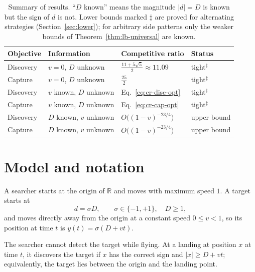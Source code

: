 \documentclass[runningheads,envcountsame,envcountsect]{llncs}
\begin{document}
\begin{table}[t]
\centering
\caption{Summary of results. ``$D$ known'' means the magnitude $|d| = D$ is known but the sign of $d$ is not. Lower bounds marked $\ddagger$ are proved for alternating strategies (Section~\ref{sec:lower}); for arbitrary side patterns only the weaker bounds of Theorem~\ref{thm:lb-universal} are known.}
\label{tab:summary}
\begin{tabular}{llll}
\toprule
Objective & Information & Competitive ratio & Status \\
\midrule
Discovery & $v = 0$, $D$ unknown & $\frac{11 + 5\sqrt{5}}{2} \approx 11.09$ & tight$^\ddagger$ \\
Capture   & $v = 0$, $D$ unknown & $\frac{25}{2}$ & tight$^\ddagger$ \\
Discovery & $v$ known, $D$ unknown & Eq.~\eqref{eq:cr-disc-opt} & tight$^\ddagger$ \\
Capture   & $v$ known, $D$ unknown & Eq.~\eqref{eq:cr-cap-opt} & tight$^\ddagger$ \\
Discovery & $D$ known, $v$ unknown & $O\big((1-v)^{-23/4}\big)$ & upper bound \\
Capture   & $D$ known, $v$ unknown & $O\big((1-v)^{-23/4}\big)$ & upper bound \\
\bottomrule
\end{tabular}
\end{table}

\FloatBarrier
\section{Model and notation}\label{sec:model}

A searcher starts at the origin of $\mathbb{R}$ and moves with maximum speed $1$. A target starts at
\[
  d = \sigma D, \qquad \sigma \in \{-1, +1\}, \quad D \geq 1,
\]
and moves directly away from the origin at a constant speed $0 \leq v < 1$, so its position at time $t$ is $y(t) = \sigma(D + vt)$.

The searcher cannot detect the target while flying. At a landing at position $x$ at time $t$, it discovers the target if $x$ has the correct sign and $|x| \geq D + vt$; equivalently, the target lies between the origin and the landing point.
\end{document}
